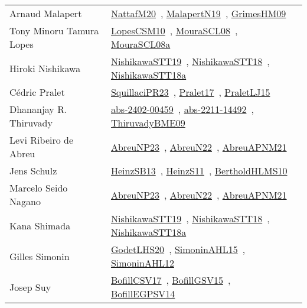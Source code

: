 {\begin{longtable}{p{4cm}p{20cm}}
Arnaud Malapert & \href{works/NattafM20.pdf}{NattafM20}~\cite{NattafM20}, \href{works/MalapertN19.pdf}{MalapertN19}~\cite{MalapertN19}, \href{works/GrimesHM09.pdf}{GrimesHM09}~\cite{GrimesHM09}\\
Tony Minoru Tamura Lopes & \href{works/LopesCSM10.pdf}{LopesCSM10}~\cite{LopesCSM10}, \href{works/MouraSCL08.pdf}{MouraSCL08}~\cite{MouraSCL08}, \href{works/MouraSCL08a.pdf}{MouraSCL08a}~\cite{MouraSCL08a}\\
Hiroki Nishikawa & \href{works/NishikawaSTT19.pdf}{NishikawaSTT19}~\cite{NishikawaSTT19}, \href{works/NishikawaSTT18.pdf}{NishikawaSTT18}~\cite{NishikawaSTT18}, \href{works/NishikawaSTT18a.pdf}{NishikawaSTT18a}~\cite{NishikawaSTT18a}\\
C{\'{e}}dric Pralet & \href{works/SquillaciPR23.pdf}{SquillaciPR23}~\cite{SquillaciPR23}, \href{works/Pralet17.pdf}{Pralet17}~\cite{Pralet17}, \href{works/PraletLJ15.pdf}{PraletLJ15}~\cite{PraletLJ15}\\
Dhananjay R. Thiruvady & \href{works/abs-2402-00459.pdf}{abs-2402-00459}~\cite{abs-2402-00459}, \href{works/abs-2211-14492.pdf}{abs-2211-14492}~\cite{abs-2211-14492}, \href{works/ThiruvadyBME09.pdf}{ThiruvadyBME09}~\cite{ThiruvadyBME09}\\
Levi Ribeiro de Abreu & \href{works/AbreuNP23.pdf}{AbreuNP23}~\cite{AbreuNP23}, \href{works/AbreuN22.pdf}{AbreuN22}~\cite{AbreuN22}, \href{works/AbreuAPNM21.pdf}{AbreuAPNM21}~\cite{AbreuAPNM21}\\
Jens Schulz & \href{works/HeinzSB13.pdf}{HeinzSB13}~\cite{HeinzSB13}, \href{works/HeinzS11.pdf}{HeinzS11}~\cite{HeinzS11}, \href{works/BertholdHLMS10.pdf}{BertholdHLMS10}~\cite{BertholdHLMS10}\\
Marcelo Seido Nagano & \href{works/AbreuNP23.pdf}{AbreuNP23}~\cite{AbreuNP23}, \href{works/AbreuN22.pdf}{AbreuN22}~\cite{AbreuN22}, \href{works/AbreuAPNM21.pdf}{AbreuAPNM21}~\cite{AbreuAPNM21}\\
Kana Shimada & \href{works/NishikawaSTT19.pdf}{NishikawaSTT19}~\cite{NishikawaSTT19}, \href{works/NishikawaSTT18.pdf}{NishikawaSTT18}~\cite{NishikawaSTT18}, \href{works/NishikawaSTT18a.pdf}{NishikawaSTT18a}~\cite{NishikawaSTT18a}\\
Gilles Simonin & \href{works/GodetLHS20.pdf}{GodetLHS20}~\cite{GodetLHS20}, \href{works/SimoninAHL15.pdf}{SimoninAHL15}~\cite{SimoninAHL15}, \href{works/SimoninAHL12.pdf}{SimoninAHL12}~\cite{SimoninAHL12}\\
Josep Suy & \href{works/BofillCSV17.pdf}{BofillCSV17}~\cite{BofillCSV17}, \href{works/BofillGSV15.pdf}{BofillGSV15}~\cite{BofillGSV15}, \href{works/BofillEGPSV14.pdf}{BofillEGPSV14}~\cite{BofillEGPSV14}\\

\end{longtable}}

